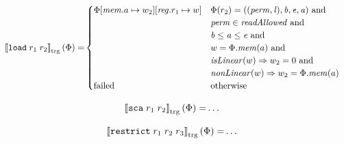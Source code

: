 \documentclass[a4paper]{article}
\newcommand{\sem}[1]{\left\llbracket #1 \right\rrbracket}
\newcommand{\tsem}[2][\Phi]{\sem{#2}_{\mathrm{trg}}(#1)}
\newcommand{\tand}{\text{ and }}
\newcommand{\totherwise}{\text{otherwise }}
\newcommand{\targetcolor}[1]{\color{black}}
\newcommand{\trg}[1]{{\targetcolor{} #1}}
\newcommand{\zinstr}[1]{\texttt{#1}}
\newcommand{\twoinstr}[3]{
  \ifthenelse{\equal{#2#3}{}}
  {\zinstr{#1}}
  {\zinstr{#1} \; #2 \; #3}
}
\newcommand{\threeinstr}[4]{
  \ifthenelse{\equal{#2#3#4}{}}
  {\zinstr{#1}}
  {\zinstr{#1} \; #2 \; #3 \; #4}
}
\newcommand{\tload}[2]{\twoinstr{\trg{load}}{#1}{#2}}
\newcommand{\tsca}[2]{\twoinstr{\trg{sca}}{#1}{#2}}
\newcommand{\trestrict}[3]{\threeinstr{\trg{restrict}}{#1}{#2}{#3}}
\newcommand{\update}[2]{[#1 \mapsto #2]}
\newcommand{\updReg}[2]{\update{\reg.#1}{#2}}
\newcommand{\perm}{\var{perm}}
\newcommand{\lin}{\var{l}}
\newcommand{\failed}{\mathrm{failed}}
\newcommand{\var}[1]{\mathit{#1}}
\newcommand{\reg}{\var{reg}}
\newcommand{\mem}{\var{mem}}
\newcommand{\baddr}{\var{b}}
\newcommand{\eaddr}{\var{e}}
\newcommand{\aaddr}{\var{a}}
\newcommand{\plainfun}[2]{
  \ifthenelse{\equal{#2}{}}
  {\mathit{#1}}
  {\mathit{#1}(#2)}
}
\newcommand{\readAllowed}[1]{\plainfun{readAllowed}{#1}}
\newcommand{\nonLinear}[1]{\plainfun{nonLinear}{#1}}
\newcommand{\isLinear}[1]{\plainfun{isLinear}{#1}}
\begin{document}
\begin{align*}
  \tsem{\tload{r_1}{r_2}} = & 
                              \begin{cases}
                                \Phi\update{\mem.a}{w_2}\updReg{r_1}{w} &
                                \arraycolsep=0pt
                                \begin{array}[t]{l}
                                  \Phi(r_2) = ((\perm,\lin),\baddr,\eaddr,\aaddr) \tand \\
                                  \perm \in \readAllowed{} \tand \\
                                  \baddr \leq \aaddr \leq \eaddr \tand \\
                                  w = \Phi.\mem(a) \tand \\
                                  \isLinear{w} \Rightarrow w_2 = 0 \tand \\
                                  \nonLinear{w} \Rightarrow w_2 = \Phi.\mem(a)
                                \end{array} \\
                                \failed & \totherwise
                              \end{cases}
\end{align*}

\begin{align*}
  \tsem{\tsca{r_1}{r_2}} = & \dots
\end{align*}

\begin{align*}
  \tsem{\trestrict{r_1}{r_2}{r_3}} = & \dots
\end{align*}
\end{document}
